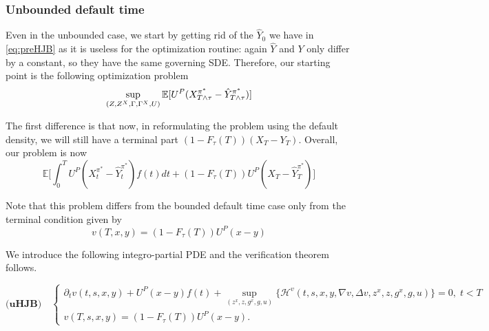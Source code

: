 \documentclass[11pt,a4paper]{article}
\theoremstyle{thmstyleone}%
\theoremstyle{thmstyletwo}%
\theoremstyle{thmstylethree}%
\newcommand{\E}{\mathbb{E}}
\newcommand{\T}{T \wedge \tau}
\begin{document}
\subsubsection{Unbounded default time}
Even in the unbounded case, we start by getting rid of the $\hat{Y}_0$ we have in \eqref{eq:preHJB} as it is useless for the optimization routine: again $\hat{Y}$ and $Y$ only differ by a constant, so they have the same governing SDE. Therefore, our starting point is the following optimization problem
\[
    \sup_{(Z, Z^X, \Gamma, \Gamma^X, U)} \mathbb{E}[U^P(X_{\T}^{\pi^*} - \hat Y^{\pi^*}_{\T})]\\
\]

The first difference is that now, in reformulating the problem using the default density, we will still have a terminal part $(1 - F_{\tau}(T))(X_T - Y_T)$. Overall, our problem is now 
\begin{equation*}
    \E\bigl[ \int_{0}^T U^P(X_t^{\pi^*} -  \hat Y^{\pi^*}_t) f(t)dt + (1 - F_{\tau}(T))U^P(X_T -  \hat Y^{\pi^*}_T)\bigl]
\end{equation*}

Note that this problem differs from the bounded default time case only from the terminal condition given by
    \[
        v(T, x, y) = (1 - F_{\tau}(T))U^P(x - y)
    \]


We introduce the following integro-partial PDE and the verification theorem follows.

\[
\textbf{(uHJB)}\quad\begin{cases}
   \partial_t v(t,s,x,y) + U^P(x - y) f(t) + \sup_{(z^x, z, g^x, g, u)}\bigl \{   \mathcal H^v(t,s, x, y, \nabla v, \Delta v, z^x, z, g^x, g, u) \bigl \}=0,\; t<T\\
v(T,s,x,y)= (1 - F_{\tau}(T))U^P(x - y).
\end{cases}
\]
\end{document}
